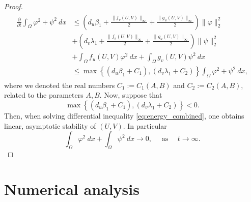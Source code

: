 \documentclass[12pt, a4paper]{article}
\theoremstyle{break}
\theoremstyle{break}
\theoremstyle{break}
\theoremstyle{break}
\theoremstyle{break}
\theoremstyle{break}
\theoremstyle{break}
\begin{document}
\begin{proof}
\begin{align}
        \label{eq:energy_combined}
        \begin{split}
            \frac{\partial}{\partial t} \int_\Omega \varphi^2 + \psi^2\:dx
            &\leq
            \left(d_u \beta_1 + \frac{\|f_v(U,V)\|_\infty}{2} + \frac{\|g_u(U,V)\|_\infty}{2}\right) \|\varphi\|_2^2 \\
            &+
            \left(d_v \lambda_1 + \frac{\|f_v(U,V)\|_\infty}{2} + \frac{\|g_u(U,V)\|_\infty}{2} \right) \|\psi\|_2^2 \\
            &+ 
            \int_\Omega f_u(U,V) \varphi^2\:dx
            +
            \int_\Omega g_v(U,V) \psi^2 \:dx \\
            &\leq
            \max\left\{\left(d_u \beta_1 + C_1
            \right), \left(d_v \lambda_1 + C_2\right)\right\}\int_\Omega \varphi^2 + \psi^2\:dx,
        \end{split}
    \end{align}
    where we denoted the real numbers $C_1:=C_1(A,B)$ and $C_2:=C_2(A,B)$, related to the parameters $A, B$. Now, suppose that
    \begin{equation}
        \max\left\{\left(d_u \beta_1 + C_1
            \right), \left(d_v \lambda_1 + C_2\right)\right\} < 0.
    \end{equation}
    Then, when solving differential inequality \eqref{eq:energy_combined}, one obtains linear, asymptotic stability of $(U, V)$. In particular
    \begin{equation}
        \int_\Omega \varphi^2\:dx + \int_\Omega \psi^2\:dx \rightarrow 0, \quad \text{ as } \quad t \rightarrow \infty.
    \end{equation}
\end{proof}
\section{Numerical analysis}
\end{document}
